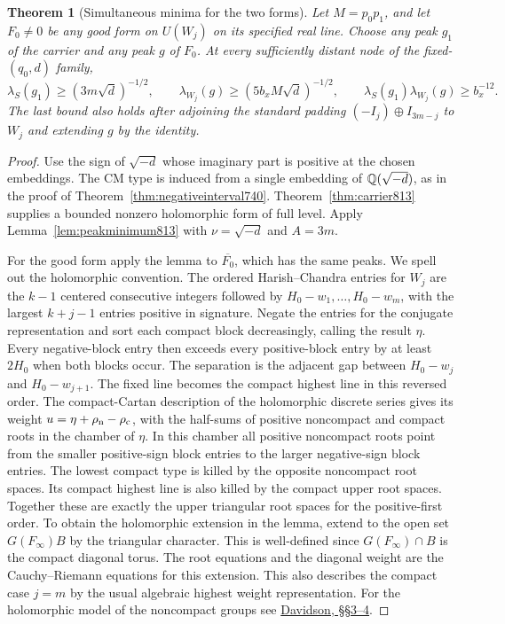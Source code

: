 \documentclass[a4paper,11pt]{article}
\newtheorem{theorem}[proposition]{Theorem}
\theoremstyle{definition}
\theoremstyle{remark}
\numberwithin{equation}{section}
\begin{document}
\begin{theorem}[Simultaneous minima for the two forms]
\leavevmode\label{thm:jointminima813}
Let \(M=p_0p_1\), and let \(F_0\ne0\) be any good form on
\(U(W_j)\) on its specified real line. Choose any peak
\(g_1\) of the carrier and any peak \(g\) of \(F_0\).
At every sufficiently distant node of the fixed-\((q_0,d)\)
family,
\[
 \lambda_S(g_1)\ge(3m\sqrt d)^{-1/2},\qquad
 \lambda_{W_j}(g)\ge(5b_x M\sqrt d)^{-1/2},\qquad
 \lambda_S(g_1)\lambda_{W_j}(g)\ge b_x^{-12}.
\]
The last bound also holds after adjoining the standard
padding \((-I_j)\oplus I_{3m-j}\) to \(W_j\) and extending
\(g\) by the identity.
\end{theorem}
\begin{proof}
Use the sign of \(\sqrt{-d}\) whose imaginary part is
positive at the chosen embeddings. The CM type is induced
from a single embedding of \(\mathbb Q(\sqrt{-d})\), as in
the proof of Theorem~\ref{thm:negativeinterval740}.
Theorem~\ref{thm:carrier813} supplies a bounded nonzero
holomorphic form of full level. Apply
Lemma~\ref{lem:peakminimum813} with
\(\nu=\sqrt{-d}\) and \(A=3m\).

For the good form apply the lemma to \(\overline{F_0}\),
which has the same peaks. We spell out the holomorphic
convention. The ordered Harish--Chandra entries for
\(W_j\) are the \(k-1\) centered consecutive integers
followed by \(H_0-w_1,\ldots,H_0-w_m\), with the largest
\(k+j-1\) entries positive in signature. Negate the
entries for the conjugate representation and sort each
compact block decreasingly, calling the result \(\eta\).
Every negative-block entry then exceeds every positive-block
entry by at least \(2H_0\) when both blocks occur. The
separation is the adjacent gap between \(H_0-w_j\) and
\(H_0-w_{j+1}\). The fixed line becomes the compact highest
line in this reversed order. The compact-Cartan description
of the holomorphic discrete series gives its weight
\(u=\eta+\rho_{\rm n}-\rho_{\rm c}\), with the half-sums
of positive noncompact and compact roots in the chamber
of \(\eta\). In this chamber all positive noncompact roots
point from the smaller positive-sign block entries to
the larger negative-sign block entries. The lowest compact
type is killed by the opposite noncompact root spaces.
Its compact highest line is also killed by the compact
upper root spaces. Together these are exactly the upper
triangular root spaces for the positive-first order.
To obtain the holomorphic extension in the lemma, extend
to the open set \(G(F_\infty)B\) by the triangular character.
This is well-defined
since \(G(F_\infty)\cap B\) is the compact diagonal torus.
The root equations and the diagonal weight are the
Cauchy--Riemann equations for this extension. This also
describes the compact case \(j=m\) by the usual algebraic
highest weight representation. For the holomorphic model
of the noncompact groups see
\href{https://msp.org/pjm/1987/129-1/pjm-v129-n1-p02-s.pdf}
{Davidson, \S\S3--4}.


\end{proof}
\end{document}
